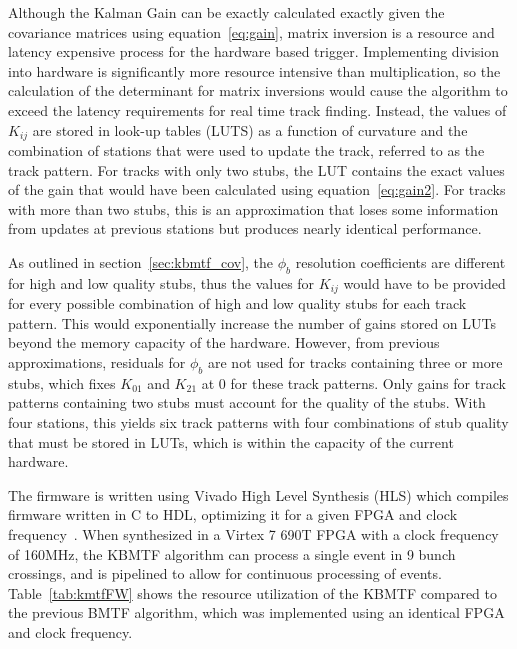 Although the Kalman Gain can be exactly calculated exactly given the covariance matrices using equation~\ref{eq:gain}, matrix inversion is a resource and latency expensive process for the hardware based trigger. Implementing division into hardware is significantly more resource intensive than multiplication, so the calculation of the determinant for matrix inversions would cause the algorithm to exceed the latency requirements for real time track finding. Instead, the values of $K_{ij}$ are stored in look-up tables (LUTS) as a function of curvature and the combination of stations that were used to update the track, referred to as the track pattern. For tracks with only two stubs, the LUT contains the exact values of the gain that would have been calculated using equation~\ref{eq:gain2}. For tracks with more than two stubs, this is an approximation that loses some information from updates at previous stations but produces nearly identical performance.

As outlined in section~\ref{sec:kbmtf_cov}, the $\phi_b$ resolution coefficients are different for high and low quality stubs, thus the values for $K_{ij}$ would have to be provided for every possible combination of high and low quality stubs for each track pattern. This would exponentially increase the number of gains stored on LUTs beyond the memory capacity of the hardware. However, from previous approximations, residuals for $\phi_b$ are not used for tracks containing three or more stubs, which fixes $K_{01}$ and $K_{21}$ at 0 for these track patterns. Only gains for track patterns containing two stubs must account for the quality of the stubs. With four stations, this yields six track patterns with four combinations of stub quality that must be stored in LUTs, which is within the capacity of the current hardware.

The firmware is written using Vivado High Level Synthesis (HLS) which compiles firmware written in C to HDL, optimizing it for a given FPGA and clock frequency~\cite{Bachtis:2648953}. When synthesized in a Virtex 7 690T FPGA with a clock frequency of 160\unit{MHz}, the KBMTF algorithm can process a single event in 9 bunch crossings, and is pipelined to allow for continuous processing of events. Table~\ref{tab:kmtfFW} shows the resource utilization of the KBMTF compared to the previous BMTF algorithm, which was implemented using an identical FPGA and clock frequency.

